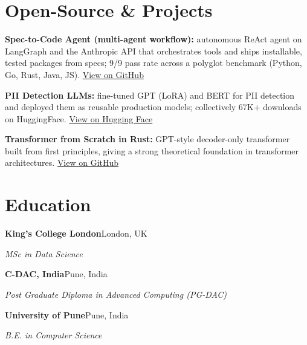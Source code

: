 \documentclass[10pt,a4paper]{article}
\begin{document}
\section{Open-Source \& Projects}
\begin{tight}
  \item \textbf{Spec-to-Code Agent (multi-agent workflow):} autonomous ReAct agent on LangGraph and the Anthropic API that orchestrates tools and ships installable, tested packages from specs; 9/9 pass rate across a polyglot benchmark (Python, Go, Rust, Java, JS). \href{https://github.com/abhijeetscode/Spec-to-Code-Agent}{View on GitHub}
  \item \textbf{PII Detection LLMs:} fine-tuned GPT (LoRA) and BERT for PII detection and deployed them as reusable production models; collectively 67K+ downloads on HuggingFace. \href{https://huggingface.co/ab-ai/pii_model}{View on Hugging Face}
  \item \textbf{Transformer from Scratch in Rust:} GPT-style decoder-only transformer built from first principles, giving a strong theoretical foundation in transformer architectures. \href{https://github.com/abhijeetscode/transformer-rust}{View on GitHub}
\end{tight}

\section{Education}
{\color{company}\bfseries King's College London}\hfill {\color{muted}London, UK}\par
{\itshape MSc in Data Science}\par\vspace{2pt}
{\color{company}\bfseries C-DAC, India}\hfill {\color{muted}Pune, India}\par
{\itshape Post Graduate Diploma in Advanced Computing (PG-DAC)}\par\vspace{2pt}
{\color{company}\bfseries University of Pune}\hfill {\color{muted}Pune, India}\par
{\itshape B.E. in Computer Science}\par
\end{document}
